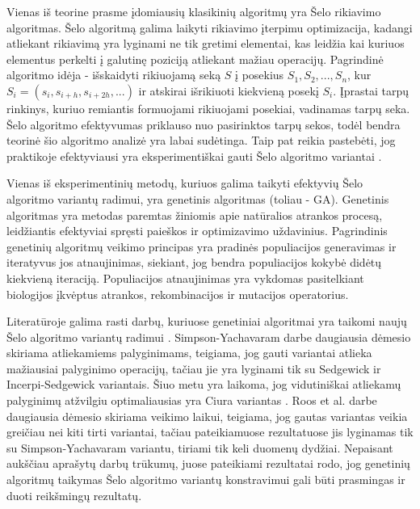 \documentclass{VUMIFInfBakalaurinis}
\begin{document}
Vienas iš teorine prasme įdomiausių klasikinių algoritmų yra Šelo rikiavimo algoritmas.
Šelo algoritmą galima laikyti rikiavimo įterpimu optimizacija, kadangi atliekant rikiavimą yra lyginami ne tik gretimi elementai,
kas leidžia kai kuriuos elementus perkelti į galutinę poziciją atliekant mažiau operacijų.
Pagrindinė algoritmo idėja - išskaidyti rikiuojamą seką $S$ į posekius $S_1, S_2, ..., S_n$, kur
$S_i = (s_i, s_{i+h}, s_{i+2h}, ...)$ ir atskirai išrikiuoti kiekvieną posekį $S_i$.
Įprastai tarpų rinkinys, kuriuo remiantis formuojami rikiuojami posekiai, vadinamas tarpų seka.
Šelo algoritmo efektyvumas priklauso nuo pasirinktos tarpų sekos, todėl bendra teorinė šio algoritmo analizė yra labai sudėtinga.
Taip pat reikia pastebėti, jog praktikoje efektyviausi yra eksperimentiškai gauti Šelo algoritmo variantai \cite{ciura2001best,tokuda1992}.

\pagebreak

Vienas iš eksperimentinių metodų, kuriuos galima taikyti efektyvių Šelo algoritmo variantų radimui, yra genetinis algoritmas (toliau - GA).
Genetinis algoritmas yra metodas paremtas žiniomis apie natūralios atrankos procesą, leidžiantis efektyviai spręsti paieškos ir optimizavimo uždavinius.
Pagrindinis genetinių algoritmų veikimo principas yra pradinės populiacijos generavimas ir iteratyvus jos atnaujinimas, siekiant, jog
bendra populiacijos kokybė didėtų kiekvieną iteraciją.
Populiacijos atnaujinimas yra vykdomas pasitelkiant biologijos įkvėptus atrankos, rekombinacijos ir mutacijos operatorius.

Literatūroje galima rasti darbų, kuriuose genetiniai algoritmai yra taikomi naujų Šelo algoritmo variantų radimui \cite{roos2002genetic,simpson1999faster}.
Simpson-Yachavaram darbe daugiausia dėmesio skiriama atliekamiems palyginimams, teigiama, jog gauti variantai atlieka mažiausiai palyginimo operacijų,
tačiau jie yra lyginami tik su Sedgewick ir Incerpi-Sedgewick variantais.
Šiuo metu yra laikoma, jog vidutiniškai atliekamų palyginimų atžvilgiu optimaliausias yra Ciura variantas \cite{ciura2001best}.
Roos et al. darbe daugiausia dėmesio skiriama veikimo laikui, teigiama, jog gautas variantas veikia greičiau nei kiti tirti variantai, tačiau
pateikiamuose rezultatuose jis lyginamas tik su Simpson-Yachavaram variantu, tiriami tik keli duomenų dydžiai.
Nepaisant aukščiau aprašytų darbų trūkumų, juose pateikiami rezultatai rodo, jog genetinių algoritmų taikymas Šelo algoritmo variantų konstravimui
gali būti prasmingas ir duoti reikšmingų rezultatų.
\end{document}

